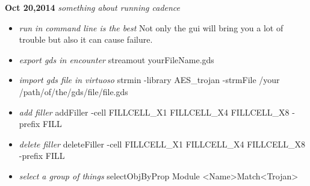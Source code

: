 \documentclass[]{article}
\begin{document}
\noindent \textbf{Oct 20,2014}
\textit{something about running cadence}
\indent		\begin{itemize}
                \item \textit{run in command line is the best} Not only the gui will bring you a lot
                        of trouble but also it can cause failure.
                \item \textit{export gds in encounter} streamout yourFileName.gds
                \item \textit{import gds file in virtuoso} strmin -library AES\_trojan -strmFile /your
                        /path/of/the/gds/file/file.gds
                \item \textit{add filler} addFiller -cell FILLCELL\_X1 FILLCELL\_X4 FILLCELL\_X8 -prefix FILL
                \item \textit{delete filler} deleteFiller -cell FILLCELL\_X1 FILLCELL\_X4 FILLCELL\_X8 -prefix FILL
                \item \textit{select a group of things} selectObjByProp Module <Name>Match<Trojan>
            \end{itemize}
\end{document}
